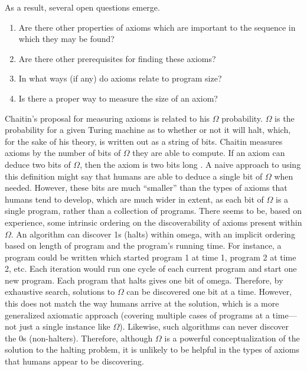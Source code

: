 As a result, several open questions emerge.

\begin{enumerate}
\item Are there other properties of axioms which are important to the sequence in which they may be found?
\item Are there other prerequisites for finding these axioms?
\item In what ways (if any) do axioms relate to program size?
\item Is there a proper way to measure the size of an axiom?
\end{enumerate}

Chaitin's proposal for measuring axioms is related to his $\Omega$ probability.  $\Omega$ is the probability for a given Turing machine as to whether or not it will halt, which, for the sake of his theory, is written out as a string of bits.  Chaitin measures axioms by the number of bits of $\Omega$ they are able to compute.  If an axiom can deduce two bits of $\Omega$, then the axiom is two bits long \citep{chaitin2007}.  A naive approach to using this definition might say that humans are able to deduce a single bit of $\Omega$ when needed.  However, these bits are much ``smaller'' than the types of axioms that humans tend to develop, which are much wider in extent, as each bit of $\Omega$ is a single program, rather than a collection of programs. There seems to be, based on experience, some intrinsic ordering on the discoverability of axioms present within $\Omega$.  An algorithm can discover 1s (halts) within omega, with an implicit ordering based on length of program and the program's running time.  For instance, a program could be written which started program 1 at time 1, program 2 at time 2, etc.  Each iteration would run one cycle of each current program and start one new program.  Each program that halts gives one bit of omega.  Therefore, by exhaustive search, solutions to $\Omega$ can be discovered one bit at a time.  However, this does not match the way humans arrive at the solution, which is a more generalized axiomatic approach (covering multiple cases of programs at a time---not just a single instance like $\Omega$).  Likewise, such algorithms can never discover the 0s (non-halters).   Therefore, although $\Omega$ is a powerful conceptualization of the solution to the halting problem, it is unlikely to be helpful in the types of axioms that humans appear to be discovering.

